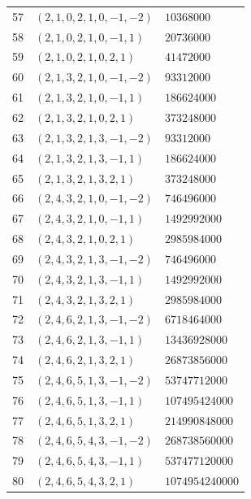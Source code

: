 \begin{longtable}{@{}rll@{}}
57 & $(2,1,0,2,1,0,-1,-2)$ & $10368000$\\
58 & $(2,1,0,2,1,0,-1,1)$ & $20736000$\\
59 & $(2,1,0,2,1,0,2,1)$ & $41472000$\\
60 & $(2,1,3,2,1,0,-1,-2)$ & $93312000$\\
61 & $(2,1,3,2,1,0,-1,1)$ & $186624000$\\
62 & $(2,1,3,2,1,0,2,1)$ & $373248000$\\
63 & $(2,1,3,2,1,3,-1,-2)$ & $93312000$\\
64 & $(2,1,3,2,1,3,-1,1)$ & $186624000$\\
65 & $(2,1,3,2,1,3,2,1)$ & $373248000$\\
66 & $(2,4,3,2,1,0,-1,-2)$ & $746496000$\\
67 & $(2,4,3,2,1,0,-1,1)$ & $1492992000$\\
68 & $(2,4,3,2,1,0,2,1)$ & $2985984000$\\
69 & $(2,4,3,2,1,3,-1,-2)$ & $746496000$\\
70 & $(2,4,3,2,1,3,-1,1)$ & $1492992000$\\
71 & $(2,4,3,2,1,3,2,1)$ & $2985984000$\\
72 & $(2,4,6,2,1,3,-1,-2)$ & $6718464000$\\
73 & $(2,4,6,2,1,3,-1,1)$ & $13436928000$\\
74 & $(2,4,6,2,1,3,2,1)$ & $26873856000$\\
75 & $(2,4,6,5,1,3,-1,-2)$ & $53747712000$\\
76 & $(2,4,6,5,1,3,-1,1)$ & $107495424000$\\
77 & $(2,4,6,5,1,3,2,1)$ & $214990848000$\\
78 & $(2,4,6,5,4,3,-1,-2)$ & $268738560000$\\
79 & $(2,4,6,5,4,3,-1,1)$ & $537477120000$\\
80 & $(2,4,6,5,4,3,2,1)$ & $1074954240000$\\
\end{longtable}
\endgroup

